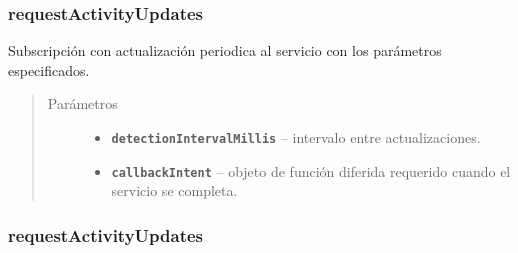 \subsubsection{requestActivityUpdates}
\label{org/hardroid/api/ActivityRecognitionApi:requestactivityupdates}

\begin{fulllineitems}
    \label{org/hardroid/api/ActivityRecognitionApi:org.hardroid.api.ActivityRecognitionApi.requestActivityUpdates(long, PendingIntent)}\par
Subscripción con actualización periodica al servicio con los parámetros especificados.
\begin{quote}\begin{description}
\item[{Parámetros}] \leavevmode\begin{itemize}
\item {} 
\textbf{\texttt{detectionIntervalMillis}} -- intervalo entre actualizaciones.

\item {} 
\textbf{\texttt{callbackIntent}} -- objeto de función diferida requerido cuando el servicio se completa. 
\end{itemize}

\end{description}\end{quote}

\end{fulllineitems}



\subsubsection{requestActivityUpdates}
\label{org/hardroid/api/ActivityRecognitionApi:id2}

